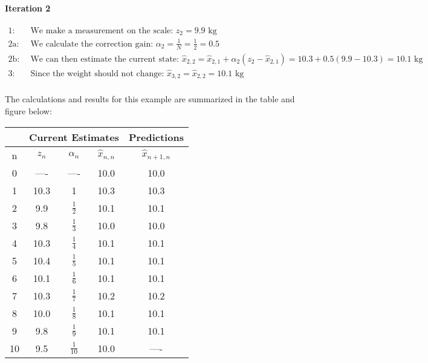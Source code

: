 \begin{example}
        \paragraph{Iteration 2}
        \begin{equation*}
            \begin{aligned} 
                1:& \text{ We make a measurement on the scale: } z_2 = 9.9 \text{ kg} \\
                2\text{a}:& \text{ We calculate the correction gain: } \alpha_2 = \frac{1}{N} = \frac{1}{2} = 0.5 \\
                2\text{b}:& \text{ We can then estimate the current state: } \hat{x}_{2,2} = \hat{x}_{2,1} + \alpha_2(z_2 - \hat{x}_{2,1}) = 10.3 + 0.5(9.9 - 10.3) = 10.1 \text{ kg} \\
                3:& \text{ Since the weight should not change: } \hat{x}_{3,2} = \hat{x}_{2,2} = 10.1 \text{ kg} \\
            \end{aligned}
        \end{equation*}

        The calculations and results for this example are summarized in the table and figure below:

        \begin{center}
            \begin{tabular}{c | c | c | c | c}
            \toprule
            & \multicolumn{3}{|c|}{Current Estimates} & Predictions \\
            \midrule
            n & $z_n$ & $\alpha_n$ & $\hat{x}_{n,n}$ & $\hat{x}_{n+1,n}$ \\
            \midrule

            0  & ---- &      ----      & 10.0 & 10.0 \\[4pt]
            1  & 10.3 &       1        & 10.3 & 10.3 \\[4pt]
            2  &  9.9 & $\frac{1}{2 }$ & 10.1 & 10.1 \\[4pt]
            3  &  9.8 & $\frac{1}{3 }$ & 10.0 & 10.0 \\[4pt]
            4  & 10.3 & $\frac{1}{4 }$ & 10.1 & 10.1 \\[4pt]
            5  & 10.4 & $\frac{1}{5 }$ & 10.1 & 10.1 \\[4pt]
            6  & 10.1 & $\frac{1}{6 }$ & 10.1 & 10.1 \\[4pt]
            7  & 10.3 & $\frac{1}{7 }$ & 10.2 & 10.2 \\[4pt]
            8  & 10.0 & $\frac{1}{8 }$ & 10.1 & 10.1 \\[4pt]
            9  &  9.8 & $\frac{1}{9 }$ & 10.1 & 10.1 \\[4pt]
            10 &  9.5 & $\frac{1}{10}$ & 10.0 & ---- \\[4pt]


\end{tabular}
\end{center}
\end{example}
